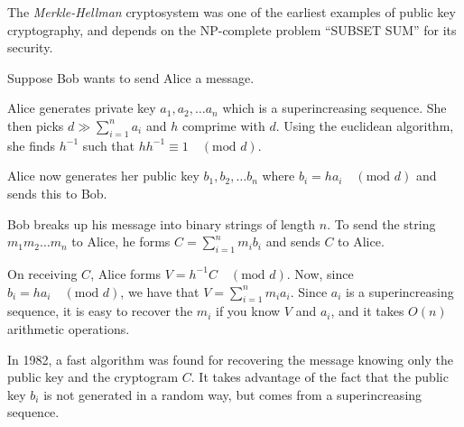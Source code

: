\documentclass[12pt]{article}
\begin{document}

The \emph{Merkle-Hellman} cryptosystem was one of the earliest examples of public key cryptography, and depends on the NP-complete problem ``SUBSET SUM'' for its security. 

Suppose Bob wants to send Alice a message. 

Alice generates private key ${a_1, a_2, \dots a_n}$ which is a superincreasing sequence. She then picks $d \gg \sum_{i=1}^n a_i$ and $h$ comprime with $d$. Using the euclidean algorithm, she finds $h^{-1}$ such that $hh^{-1} \equiv 1 \quad (\textrm{mod }d)$.

Alice now generates her public key ${b_1, b_2, \dots b_n}$ where $b_i = ha_i\quad (\textrm{mod }d)$ and sends this to Bob.

Bob breaks up his message into binary strings of length $n$. To send the string $m_1 m_2 \dots m_n$ to Alice, he forms $C = \sum_{i=1}^n m_i b_i$ and sends $C$ to Alice.

On receiving $C$, Alice forms $V = h^{-1}C \quad (\textrm{mod }d)$. Now, since $b_i = ha_i\quad (\textrm{mod }d)$, we have that $V = \sum_{i=1}^n m_i a_i$. Since ${a_i}$ is a superincreasing sequence, it is easy to recover the $m_i$ if you know $V$ and ${a_i}$, and it takes $O(n)$ arithmetic operations.

In 1982, a fast algorithm was found for recovering the message knowing only the public key and the cryptogram $C$. It takes advantage of the fact that the public key ${b_i}$ is not generated in a random way, but comes from a superincreasing sequence.
\end{document}
